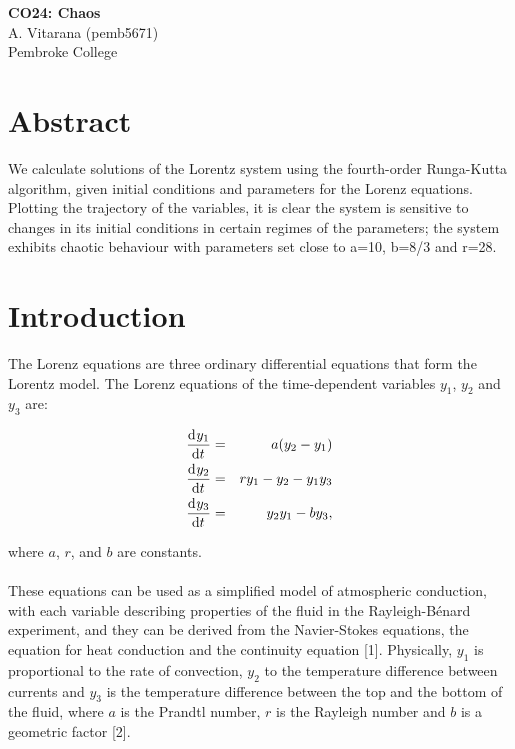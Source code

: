 \documentclass[a4paper,11pt]{article}
\begin{document}
\begin{center}
\Large{\textbf{CO24: Chaos}}\\ 
\vspace{1em}
\large{A. Vitarana (pemb5671)}\\
\large{Pembroke College}
\end{center}

\section{Abstract}
We calculate solutions of the Lorentz system using the fourth-order Runga-Kutta algorithm, given initial conditions and parameters for the Lorenz equations. Plotting the trajectory of the variables, it is clear the system is sensitive to changes in its initial conditions in certain regimes of the parameters; the system exhibits chaotic behaviour with parameters set close to a=10, b=8/3 and r=28. 


\section{Introduction}

The Lorenz equations are three ordinary differential equations that form the Lorentz model. The Lorenz equations of the time-dependent variables $y_{1}$, $y_{2}$ and $y_{3}$ are:

\begin{eqnarray}
   \dod{y_{1}}{t} &=& a(y_{2}-y_{1})        \\
   \dod{y_{2}}{t} &=& ry_{1} -y_{2}-y_{1}y_{3}   \\ 
   \dod{y_{3}}{t} &=& y_{2}y_{1} - by_{3} , 
\label{eqn:model_1}
\end{eqnarray}

where $a$, $r$, and $b$ are constants.\\
\\
These equations can be used as a simplified model of atmospheric conduction, with each variable describing properties of the fluid in the Rayleigh-Bénard experiment, and they can be derived from the Navier-Stokes equations, the equation for heat conduction and the continuity equation [1]. Physically, $y_{1}$ is proportional to the rate of convection, $y_{2}$ to the temperature difference between currents and $y_{3}$ is the temperature difference between the top and the bottom of the fluid, where $a$ is the Prandtl number, $r$ is the Rayleigh number and $b$ is a geometric factor [2]. \\
\\
\end{document}
